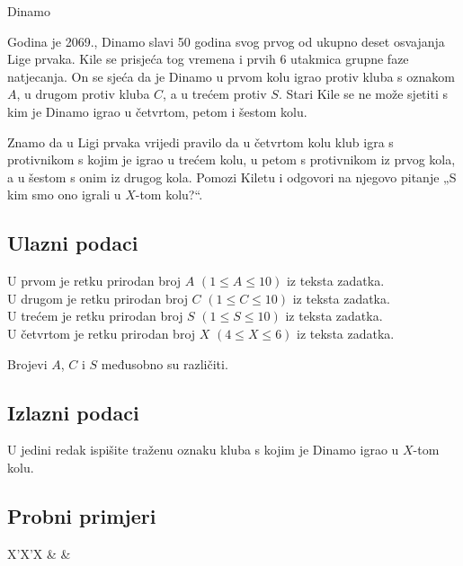 \begin{statement}[
  problempoints=20,
  timelimit=1 sekunda,
  memorylimit=512 MiB,
]{Dinamo}

Godina je 2069., Dinamo slavi 50 godina svog prvog od ukupno deset osvajanja
Lige prvaka. Kile se prisjeća tog vremena i prvih 6 utakmica grupne faze
natjecanja. On se sjeća da je Dinamo u prvom kolu igrao protiv kluba s oznakom
$A$, u drugom protiv kluba $C$, a u trećem protiv $S$. Stari Kile se ne može
sjetiti s kim je Dinamo igrao u četvrtom, petom i šestom kolu.

Znamo da u Ligi prvaka vrijedi pravilo da u četvrtom kolu klub igra s
protivnikom s kojim je igrao u trećem kolu, u petom s protivnikom iz prvog kola,
a u šestom s onim iz drugog kola. Pomozi Kiletu i odgovori na njegovo pitanje
„S kim smo ono igrali u $X$-tom kolu?“.

\subsection*{Ulazni podaci}
U prvom je retku prirodan broj $A$ $(1 \le A \le 10)$ iz teksta zadatka. \\
U drugom je retku prirodan broj $C$ $(1 \le C \le 10)$ iz teksta zadatka. \\
U trećem je retku prirodan broj $S$ $(1 \le S \le 10)$ iz teksta zadatka. \\
U četvrtom je retku prirodan broj $X$ $(4 \le X \le 6)$ iz teksta zadatka.

Brojevi $A$, $C$ i $S$ međusobno su različiti.

\subsection*{Izlazni podaci}
U jedini redak ispišite traženu oznaku kluba s kojim je Dinamo igrao u $X$-tom
kolu.


\subsection*{Probni primjeri}
\begin{tabularx}{\textwidth}{X'X'X}
 &
 &
\end{tabularx}


\end{statement}
